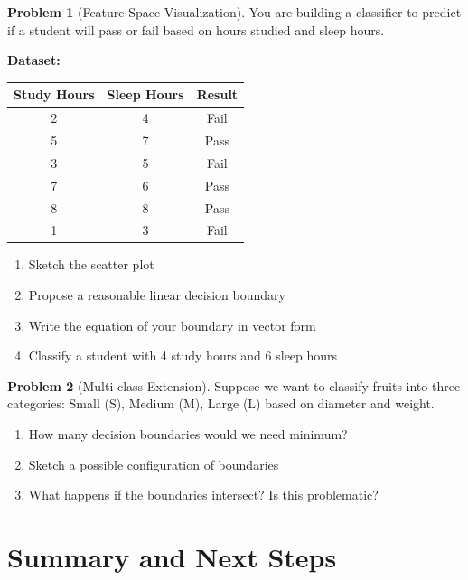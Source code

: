 \documentclass[12pt,a4paper]{article}
\theoremstyle{directpoint}
\theoremstyle{definition}
\newtheorem{problem}{Problem}[section]
\begin{document}
\begin{problem}[Feature Space Visualization]
You are building a classifier to predict if a student will pass or fail based on hours studied and sleep hours.

\textbf{Dataset:}
\begin{center}
\begin{tabular}{|c|c|c|}
\hline
\textbf{Study Hours} & \textbf{Sleep Hours} & \textbf{Result} \\
\hline
2 & 4 & Fail \\
5 & 7 & Pass \\
3 & 5 & Fail \\
7 & 6 & Pass \\
8 & 8 & Pass \\
1 & 3 & Fail \\
\hline
\end{tabular}
\end{center}

\begin{enumerate}[label=(\alph*)]
    \item Sketch the scatter plot
    \item Propose a reasonable linear decision boundary
    \item Write the equation of your boundary in vector form
    \item Classify a student with 4 study hours and 6 sleep hours
\end{enumerate}
\end{problem}

\begin{problem}[Multi-class Extension]
Suppose we want to classify fruits into three categories: Small (S), Medium (M), Large (L) based on diameter and weight.
\begin{enumerate}[label=(\alph*)]
    \item How many decision boundaries would we need minimum?
    \item Sketch a possible configuration of boundaries
    \item What happens if the boundaries intersect? Is this problematic?
\end{enumerate}
\end{problem}

\newpage

\section{Summary and Next Steps}
\end{document}
